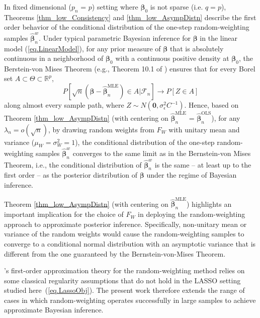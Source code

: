 \documentclass[ejs,authoryear,linksfromyear]{imsart}
\newcommand{\bnw}{\widehat{\bm{\beta}}_n^w} %
\newcommand{\bLS}{\widehat{\bm{\beta}}_n^{\text{OLS}}} %
\newcommand{\bMLE}{\widehat{\bm{\beta}}_n^{\text{MLE}}} %
\numberwithin{equation}{section}
\theoremstyle{plain}
\begin{document}
In fixed dimensional ($p_n$ = $p$) setting where $\bm{\beta}_0$ is not sparse (i.e. $q = p$), Theorems \ref{thm_low_Consistency} and \ref{thm_low_AsympDistn} describe the first order behavior of the conditional distribution of the one-step random-weighting samples $\bnw$. Under typical parametric Bayesian inference for $\bm{\beta}$ in the linear model (\ref{eq.LinearModel}), for any prior measure of $\bm{\beta}$ that is absolutely continuous in a neighborhood of $\bm{\beta}_0$ with a continuous positive density at $\bm{\beta}_0$, the Berstein-von Mises Theorem (e.g., Theorem 10.1 of \citet{vanderVaartbook}) ensures that for every Borel set $A \subset \Theta \subset \mathbb{R}^p$,
$$
P \left[
\sqrt{n} 
\left(
\bm{\beta} -  \bMLE
\right)
\in A \big| \mathcal{F}_n
\right]
\to 
P \left[
Z \in A
\right]
$$   
along almost every sample path, where $Z \sim N ( \bm{0}, \sigma^2_{\epsilon} C^{-1} )$. Hence, based on Theorem \ref{thm_low_AsympDistn} (with centering on $\bMLE$ = $\bLS$), for any $\lambda_n = o(\sqrt{n})$, by drawing random weights from $F_W$ with unitary mean and variance ($\mu_W = \sigma^2_W = 1$), the conditional distribution of the one-step random-weighting samples $\bnw$ converges to the same limit as in the Bernstein-von Mises Theorem, i.e., the conditional distribution of $\bnw$ is the same -- at least up to the first order -- as the posterior distribution of $\bm{\beta}$ under the regime of Bayesian inference. 

Theorem \ref{thm_low_AsympDistn} (with centering on $\bMLE$) highlights an important implication for the choice of $F_W$ in deploying the random-weighting approach to approximate posterior inference. Specifically, non-unitary mean or variance of the random weights would cause the random-weighting samples to converge to a conditional normal distribution with an asymptotic variance that is different from the one guaranteed by the Bernstein-von-Mises Theorem. 

 \citet{Newton&Raftery}'s first-order approximation theory for the random-weighting method relies on some classical regularity assumptions that do not hold in the LASSO setting studied here~(\ref{eq.LassoObj}). 
 The present work therefore extends the range of cases in which random-weighting operates successfully in large samples to achieve approximate Bayesian inference. 
\end{document}
